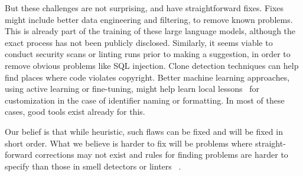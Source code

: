 But these challenges are not surprising, and have straightforward fixes.
Fixes might include better data engineering and filtering, to remove known problems. This is already part of the training of these large language models, although the exact process has not been publicly disclosed. 
Similarly, it seems viable to conduct security scans or linting runs prior to making a suggestion, in order to remove obvious problems like SQL injection. 
Clone detection techniques can help find places where code violates copyright. 
Better machine learning approaches, using active learning or fine-tuning, might help learn local lessons~\cite{Menzies2013} for customization in the case of identifier naming or formatting.
In most of these cases, good tools exist already for this. 

Our belief is that while heuristic, such flaws can be fixed and will be fixed in short order. 
What we believe is harder to fix will be problems where straight-forward corrections may not exist and rules for finding problems are harder to specify than those in smell detectors or linters ~\cite{Ernst2017}.
